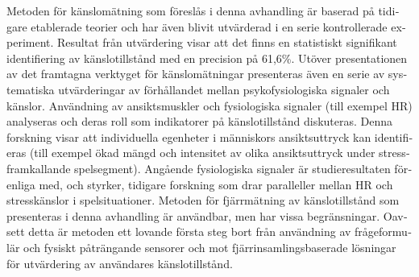 \begin{otherlanguage}{swedish}
Metoden för känslomätning som föreslås i denna avhandling är baserad på tidigare etablerade teorier och har även blivit utvärderad i en serie kontrollerade experiment. Resultat från utvärdering visar att det finns en statistiskt signifikant identifiering av känslotillstånd med en precision på 61,6\%. Utöver presentationen av det framtagna verktyget för känslomätningar presenteras även en serie av systematiska utvärderingar av förhållandet mellan psykofysiologiska signaler och känslor. Användning av ansiktsmuskler och fysiologiska signaler (till exempel HR) analyseras och deras roll som indikatorer på känslotillstånd diskuteras. Denna forskning visar att individuella egenheter i människors ansiktsuttryck kan identifieras (till exempel ökad mängd och intensitet av olika ansiktsuttryck under stressframkallande spelsegment). Angående fysiologiska signaler är studieresultaten förenliga med, och styrker, tidigare forskning som drar paralleller mellan HR och stresskänslor i spelsituationer. Metoden för fjärrmätning av känslotillstånd som presenteras i denna avhandling är användbar, men har vissa begränsningar. Oavsett detta är metoden ett lovande första steg bort från användning av frågeformulär och fysiskt påträngande sensorer och mot fjärrinsamlingsbaserade lösningar för utvärdering av användares känslotillstånd.

\end{otherlanguage}
